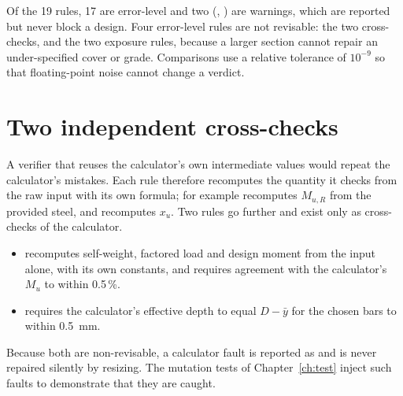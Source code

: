 Of the 19 rules, 17 are error-level and two (, ) are warnings, which are reported but never block a design. Four error-level rules are not revisable: the two cross-checks, and the two exposure rules, because a larger section cannot repair an under-specified cover or grade. Comparisons use a relative tolerance of $10^{-9}$ so that floating-point noise cannot change a verdict.

\section{Two independent cross-checks}
A verifier that reuses the calculator's own intermediate values would repeat the calculator's mistakes. Each rule therefore recomputes the quantity it checks from the raw input with its own formula; for example  recomputes $M_{u,R}$ from the provided steel, and  recomputes $x_u$. Two rules go further and exist only as cross-checks of the calculator.
\begin{itemize}
  \item {} recomputes self-weight, factored load and design moment from the input alone, with its own constants, and requires agreement with the calculator's $M_u$ to within 0.5\,\%.
  \item {} requires the calculator's effective depth to equal $D - \bar y$ for the chosen bars to within 0.5~mm.
\end{itemize}
Because both are non-revisable, a calculator fault is reported as  and is never repaired silently by resizing. The mutation tests of Chapter~\ref{ch:test} inject such faults to demonstrate that they are caught.

